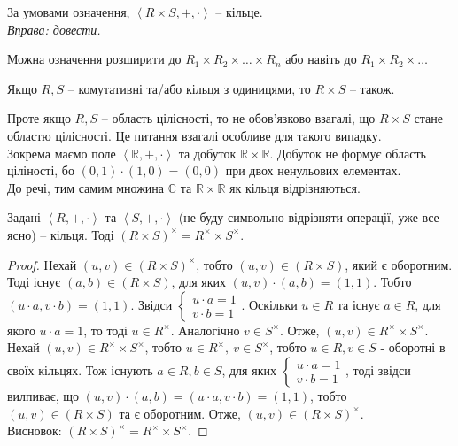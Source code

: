 \documentclass{math_library}
\begin{document}
\begin{proposition}
За умовами означення, $\left< R \times S, +, \cdot \right>$ -- кільце.\\
\textit{Вправа: довести.}
\end{proposition}

\begin{remark}
Можна означення розширити до $R_1 \times R_2 \times \dots \times R_n$ або навіть до $R_1 \times R_2 \times \dots$
\end{remark}

\begin{remark}
Якщо $R,S$ -- комутативні та/або кільця з одиницями, то $R \times S$ -- також.
\end{remark}

\begin{remark}
Проте якщо $R,S$ -- область цілісності, то не обов'язково взагалі, що $R \times S$ стане областю цілісності. Це питання взагалі особливе для такого випадку.\\
Зокрема маємо поле $\left<\mathbb{R},+,\cdot\right>$ та добуток $\mathbb{R} \times \mathbb{R}$. Добуток не формує область ціліності, бо $(0,1) \cdot (1,0) = (0,0)$ при двох ненульових елементах.\\
До речі, тим самим множина $\mathbb{C}$ та $\mathbb{R} \times \mathbb{R}$ як кільця відрізняються.
\end{remark}

\begin{proposition}
Задані $\left< R,+,\cdot \right>$ та $\left< S,+,\cdot \right>$ (не буду символьно відрізняти операції, уже все ясно) -- кільця. Тоді $(R \times S)^\times = R^{\times} \times S^{\times}$.
\end{proposition}

\begin{proof}
Нехай $(u,v) \in (R \times S)^\times$, тобто $(u,v) \in (R \times S)$, який є оборотним. Тоді існує $(a,b) \in (R \times S)$, для яких $(u,v) \cdot (a,b) = (1,1)$. Тобто $(u \cdot a, v \cdot b) = (1,1)$. Звідси $\begin{cases} u \cdot a = 1 \\ v \cdot b = 1 \end{cases}$. Оскільки $u \in R$ та існує $a \in R$, для якого $u \cdot a = 1$, то тоді $u \in R^\times$. Аналогічно $v \in S^\times$. Отже, $(u,v) \in R^\times \times S^\times$.\\
Нехай $(u,v) \in R^\times \times S^{\times}$, тобто $u \in R^\times,\ v \in S^\times$, тобто $u \in R, v \in S$ - оборотні в своїх кільцях. Тож існують $a \in R,b \in S$, для яких $\begin{cases} u \cdot a = 1 \\ v \cdot b = 1 \end{cases}$, тоді звідси вилпиває, що $(u,v) \cdot (a,b) = (u \cdot a, v \cdot b) = (1,1)$, тобто $(u,v) \in (R \times S)$ та є оборотним. Отже, $(u,v) \in (R \times S)^\times$.\\
Висновок: $(R \times S)^\times = R^\times \times S^\times$.
\end{proof}
\newpage
\end{document}
